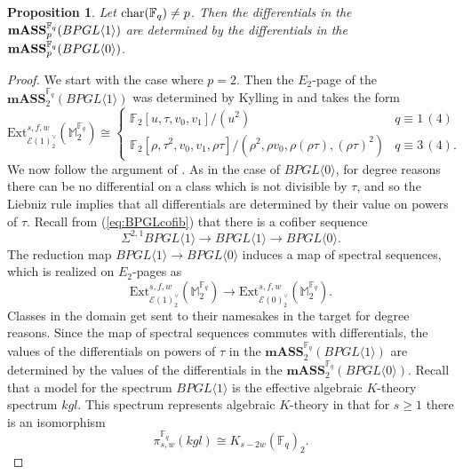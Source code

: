 \documentclass{amsart}
\newtheorem{proposition}[theorem]{Proposition}
\theoremstyle{plain}
\numberwithin{theorem}{section}
\numberwithin{equation}{section}
\numberwithin{figure}{section}
\newcommand{\0}{\langle 0 \rangle }
\begin{document}
\begin{proposition}
\label{bpgl1 difs finite fields}
    Let $\textup{{char}}(\mathbb{F}_q) \neq p$. Then the differentials in the $\textup{\textbf{mASS}}_p^{\mathbb{F}_q}(BPGL \langle 1 \rangle)$ are determined by the differentials in the $\textup{\textbf{mASS}}^{\mathbb{F}_q}_p(BPGL \langle 0 \rangle)$. 
\end{proposition}

\begin{proof}
    We start with the case where $p=2$. Then the $E_2$-page of the $\textbf{mASS}^{\mathbb{F}_q}_2(BPGL \langle 1 \rangle)$ was determined by Kylling in \cite[Theorem 4.1.2, Theorem 4.1.4]{Kylingkqfinite} and takes the form 
    \[\text{Ext}^{s,f,w}_{\mathcal{E}(1)^\vee_2}(\mathbb{M}_2^{\mathbb{F}_q}) \cong \left\{ \begin{array}{ll}
    \mathbb{F}_2[u, \tau, v_0, v_1]/(u^2) & q \equiv 1 \, (4) \\
    \mathbb{F}_2[\rho, \tau^2, v_0, v_1, \rho\tau]/(\rho^2, \rho v_0, \rho(\rho\tau), (\rho\tau)^2) & q \equiv 3 \, (4).
    \end{array}\right.\]
    We now follow the argument of \cite[Section 4.2]{Kylingkqfinite}. As in the case of $BPGL \langle 0 \rangle$, for degree reasons there can be no differential on a class which is not divisible by $\tau$, and so the Liebniz rule implies that all differentials are determined by their value on powers of $\tau$. Recall from  (\cref{eq:BPGLcofib}) that there is a cofiber sequence
    \[\Sigma^{2,1}BPGL \langle 1 \rangle \to BPGL \langle 1 \rangle \to BPGL \langle 0 \rangle.\]
    The reduction map $BPGL \langle 1 \rangle \to BPGL \langle 0 \rangle$ induces a map of spectral sequences, which is realized on $E_2$-pages as
    \[\text{Ext}^{s,f,w}_{\mathcal{E}(1)_2^\vee}(\mathbb{M}_2^{\mathbb{F}_q}) \to \text{Ext}^{s,f,w}_{\mathcal{E}(0)_2^\vee}(\mathbb{M}^{\mathbb{F}_q}_2). \]
    Classes in the domain get sent to their namesakes in the target for degree reasons. Since the map of spectral sequences commutes with differentials, the values of the differentials on powers of $\tau$ in the $\textbf{mASS}_2^{\mathbb{F}_q}(BPGL \langle 1 \rangle)$ are determined by the values of the differentials in the $\textbf{mASS}_2^{\mathbb{F}_q}(BPGL \langle 0 \rangle)$. Recall that a model for the spectrum $BPGL \langle 1 \rangle$ is the effective algebraic $K$-theory spectrum $kgl$. This spectrum represents algebraic $K$-theory in that for $s \geq 1$ there is an isomorphism
    \[\pi_{s,w}^{\mathbb{F}_q}(kgl) \cong K_{s-2w}(\mathbb{F}_q)_2.\]

\end{proof}
\end{document}
